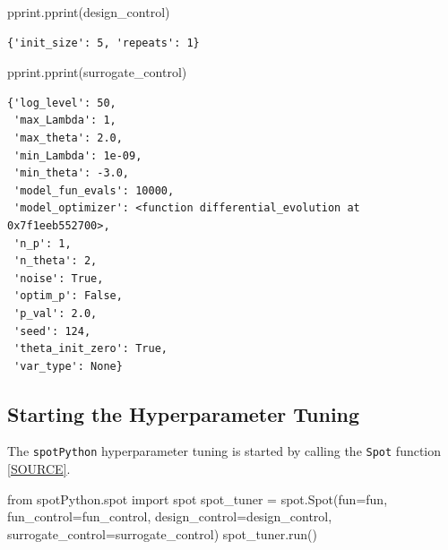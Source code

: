 \documentclass[
  letterpaper,
  DIV=11,
  numbers=noendperiod]{scrreprt}
\newenvironment{Shaded}{\begin{snugshade}}{\end{snugshade}}
\newcommand{\ImportTok}[1]{\textcolor[rgb]{0.00,0.46,0.62}{#1}}
\newcommand{\NormalTok}[1]{\textcolor[rgb]{0.00,0.23,0.31}{#1}}
\newcommand{\OperatorTok}[1]{\textcolor[rgb]{0.37,0.37,0.37}{#1}}
\begin{document}
\begin{Shaded}
\begin{Highlighting}[]
\NormalTok{pprint.pprint(design\_control)}
\end{Highlighting}
\end{Shaded}

\begin{verbatim}
{'init_size': 5, 'repeats': 1}
\end{verbatim}

\begin{Shaded}
\begin{Highlighting}[]
\NormalTok{pprint.pprint(surrogate\_control)}
\end{Highlighting}
\end{Shaded}

\begin{verbatim}
{'log_level': 50,
 'max_Lambda': 1,
 'max_theta': 2.0,
 'min_Lambda': 1e-09,
 'min_theta': -3.0,
 'model_fun_evals': 10000,
 'model_optimizer': <function differential_evolution at 0x7f1eeb552700>,
 'n_p': 1,
 'n_theta': 2,
 'noise': True,
 'optim_p': False,
 'p_val': 2.0,
 'seed': 124,
 'theta_init_zero': True,
 'var_type': None}
\end{verbatim}

\subsection{Starting the Hyperparameter
Tuning}\label{sec-call-the-hyperparameter-tuner-32}

The \texttt{spotPython} hyperparameter tuning is started by calling the
\texttt{Spot} function
\href{https://github.com/sequential-parameter-optimization/spotPython/blob/main/src/spotPython/spot/spot.py}{{[}SOURCE{]}}.

\begin{Shaded}
\begin{Highlighting}[]
\ImportTok{from}\NormalTok{ spotPython.spot }\ImportTok{import}\NormalTok{ spot}
\NormalTok{spot\_tuner }\OperatorTok{=}\NormalTok{ spot.Spot(fun}\OperatorTok{=}\NormalTok{fun,}
\NormalTok{                       fun\_control}\OperatorTok{=}\NormalTok{fun\_control,}
\NormalTok{                       design\_control}\OperatorTok{=}\NormalTok{design\_control,}
\NormalTok{                       surrogate\_control}\OperatorTok{=}\NormalTok{surrogate\_control)}
\NormalTok{spot\_tuner.run()}
\end{Highlighting}
\end{Shaded}
\end{document}
